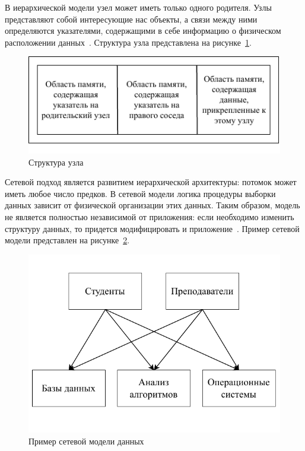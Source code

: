 В иерархической модели узел может иметь только одного родителя. 
Узлы представляют собой интересующие нас объекты, а связи между ними определяются указателями, содержащими в себе информацию о физическом расположении данных~\cite{guschin-db-2015}. 
Структура узла представлена на рисунке~\ref{ierarch-struct}.

\begin{figure}[ht]
	\centering
	\includegraphics[scale=1.5]{img/ierarch-struct.pdf}
	\caption{Структура узла}
	\label{ierarch-struct}
\end{figure}

Сетевой подход является развитием иерархической архитектуры: потомок может иметь любое число предков. 
В сетевой модели логика процедуры выборки данных зависит от физической организации этих данных. 
Таким образом, модель не является полностью независимой от приложения: 
если необходимо изменить структуру данных, то придется модифицировать и приложение~\cite{guschin-db-2015}. Пример сетевой модели представлен на рисунке~\ref{netw}.\pagebreak

\begin{figure}[ht]
	\centering
	\includegraphics[scale=1]{img/netw.pdf}
	\caption{Пример сетевой модели данных}
	\label{netw}
\end{figure}

